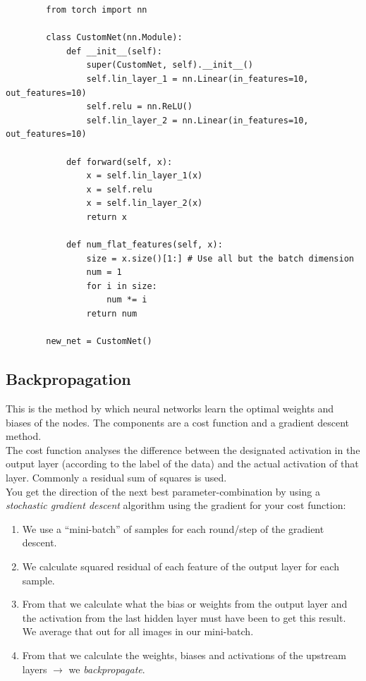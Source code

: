 \documentclass[
]{book}
\begin{document}
\begin{verbatim}
        from torch import nn

        class CustomNet(nn.Module):
            def __init__(self):
                super(CustomNet, self).__init__()
                self.lin_layer_1 = nn.Linear(in_features=10, out_features=10)
                self.relu = nn.ReLU()
                self.lin_layer_2 = nn.Linear(in_features=10, out_features=10)

            def forward(self, x):
                x = self.lin_layer_1(x)
                x = self.relu
                x = self.lin_layer_2(x)
                return x

            def num_flat_features(self, x):
                size = x.size()[1:] # Use all but the batch dimension
                num = 1
                for i in size:
                    num *= i
                return num

        new_net = CustomNet()
\end{verbatim}

\hypertarget{backpropagation}{%
\subsection{Backpropagation}\label{backpropagation}}

This is the method by which neural networks learn the optimal weights
and biases of the nodes. The components are a cost function and a
gradient descent method.\\
The cost function analyses the difference between the designated
activation in the output layer (according to the label of the data) and
the actual activation of that layer. Commonly a residual sum of squares
is used.\\
You get the direction of the next best parameter-combination by using a
\emph{stochastic gradient descent} algorithm using the gradient for your cost
function:

\begin{enumerate}
\def\labelenumi{\arabic{enumi}.}
\item
  We use a ``mini-batch'' of samples for each round/step of the gradient
  descent.
\item
  We calculate squared residual of each feature of the output layer
  for each sample.
\item
  From that we calculate what the bias or weights from the output
  layer and the activation from the last hidden layer must have been
  to get this result. We average that out for all images in our
  mini-batch.
\item
  From that we calculate the weights, biases and activations of the
  upstream layers \(\rightarrow\) we \emph{backpropagate}.
\end{enumerate}
\end{document}
